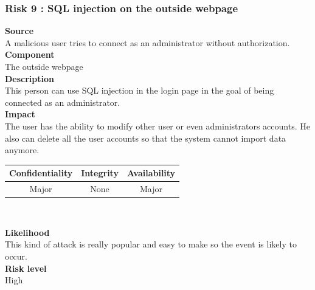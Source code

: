 \documentclass[a4paper,11pt]{article}
\begin{document}
\subsubsection{Risk 9 : SQL injection on the outside webpage }
\textbf{Source} \\A malicious user tries to connect as an administrator without authorization.\\
\textbf{Component} \\The outside webpage\\
\textbf{Description}\\This person can use SQL injection in the login page in the goal of being connected as an administrator. \\
\textbf{Impact}\\
The user has the ability to modify other user or even administrators accounts. He also can delete all the user accounts so that the system cannot import data anymore.\\
\begin{center}
\begin{tabular}{|c|c|c|}
\hline
\textbf{Confidentiality} & \textbf{Integrity} & \textbf{Availability} \\
\hline
Major & None & Major \\
\hline
\end{tabular}\\
\end{center}
\textbf{Likelihood}\\ This kind of attack is really popular and easy to make so the event is likely to occur.\\
\textbf{Risk level}\\High\\
\end{document}
